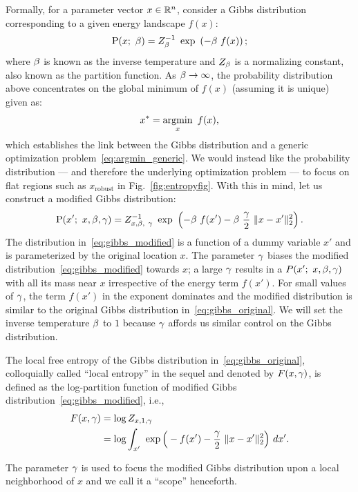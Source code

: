 \documentclass[10pt]{article}
\begin{document}
Formally, for a parameter vector $x \in \mathbb{R}^n$, consider a Gibbs distribution corresponding to a given energy landscape $f(x)$:
\begin{equation}
    \P(x;\ \b) = Z_\b^{-1}\ \exp\ \rbrac{-\b\ f(x)};
    \label{eq:gibbs_original}
\end{equation}
where $\beta$ is known as the inverse temperature and $Z_\beta$ is a normalizing constant, also known 
as the partition function. As $\beta \to \infty$, the probability distribution above concentrates on the global minimum of $f(x)$ (assuming it is unique) given as:
\begin{equation}
    x^* = \operatorname*{argmin}_x\ f(x),
    \label{eq:argmin_generic}
\end{equation}
which establishes the link between the Gibbs distribution and a generic optimization problem~\eqref{eq:argmin_generic}. We would instead like the probability distribution --- and therefore the underlying optimization problem --- to focus on flat regions such as $x_{\textrm{robust}}$ in Fig.~\ref{fig:entropyfig}. With this in mind, let us construct a modified Gibbs distribution:
\begin{equation}
    \P(x';\ x, \b, \g) = Z_{x,\b,\ \g}^{-1}\ \exp\ \rbrac{-\b\ f(x') - \b\ \f{\g}{2}\ \norm{x-x'}^2_2}.
    \label{eq:gibbs_modified}
\end{equation}
The distribution in~\eqref{eq:gibbs_modified} is a function of a dummy variable $x'$ and is parameterized by the original location $x$. The parameter $\gamma$ biases the modified distribution~\eqref{eq:gibbs_modified} towards $x$; a large $\gamma$ results in a $P(x';\ x,\beta,\gamma)$ with all its mass near $x$ irrespective of the energy term $f(x')$. For small values of $\gamma$, the term $f(x')$ in the exponent dominates and the modified distribution is similar to the original Gibbs distribution in~\eqref{eq:gibbs_original}. We will set the inverse temperature $\beta$ to $1$ because $\gamma$ affords us similar control on the Gibbs distribution.

\begin{definition}
\label{def:local_entropy}
The local free entropy of the Gibbs distribution in~\eqref{eq:gibbs_original}, colloquially called ``local entropy'' in the sequel and denoted by $F(x, \gamma)$, is defined as the log-partition function of modified Gibbs distribution~\eqref{eq:gibbs_modified}, i.e.,
\begin{align}
    F(x, \gamma) &= \log Z_{x, 1, \gamma} \notag\\
    &= \log \int_{x'}\ \exp \Big(-f(x') - \frac{\gamma}{2}\ \lVert x-x'\rVert^2_2 \Big)\ dx'.
    \label{eq:local_entropy}
\end{align}
\end{definition}
The parameter $\gamma$ is used to focus the modified Gibbs distribution upon a local neighborhood of $x$ and we call it a ``scope'' henceforth.
\end{document}
